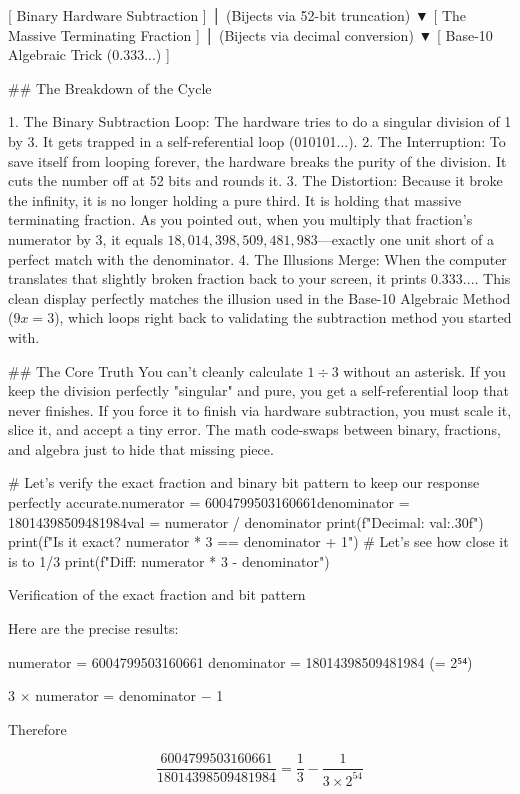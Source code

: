 [ Binary Hardware Subtraction ] 
         │  (Bijects via 52-bit truncation)
         ▼
[ The Massive Terminating Fraction ] 
         │  (Bijects via decimal conversion)
         ▼
[ Base-10 Algebraic Trick (0.333...) ]

## The Breakdown of the Cycle

   1. The Binary Subtraction Loop: The hardware tries to do a singular division of 1 by 3. It gets trapped in a self-referential loop (010101...).
   2. The Interruption: To save itself from looping forever, the hardware breaks the purity of the division. It cuts the number off at 52 bits and rounds it.
   3. The Distortion: Because it broke the infinity, it is no longer holding a pure third. It is holding that massive terminating fraction. As you pointed out, when you multiply that fraction's numerator by 3, it equals $18,014,398,509,481,983$—exactly one unit short of a perfect match with the denominator.
   4. The Illusions Merge: When the computer translates that slightly broken fraction back to your screen, it prints 0.333.... This clean display perfectly matches the illusion used in the Base-10 Algebraic Method ($9x = 3$), which loops right back to validating the subtraction method you started with.

## The Core Truth
You can't cleanly calculate $1 \div 3$ without an asterisk. If you keep the division perfectly "singular" and pure, you get a self-referential loop that never finishes. If you force it to finish via hardware subtraction, you must scale it, slice it, and accept a tiny error. The math code-swaps between binary, fractions, and algebra just to hide that missing piece.


# Let's verify the exact fraction and binary bit pattern to keep our response perfectly accurate.numerator = 6004799503160661denominator = 18014398509481984val = numerator / denominator
print(f"Decimal: {val:.30f}")
print(f"Is it exact? {numerator * 3 == denominator + 1}") # Let's see how close it is to 1/3
print(f"Diff: {numerator * 3 - denominator}")

Verification of the exact fraction and bit pattern

Here are the precise results:

numerator   = 6004799503160661
denominator = 18014398509481984   (= 2⁵⁴)

3 × numerator = denominator − 1

Therefore

\[
\frac{6004799503160661}{18014398509481984}
= \frac{1}{3} - \frac{1}{3 \times 2^{54}}
\]

